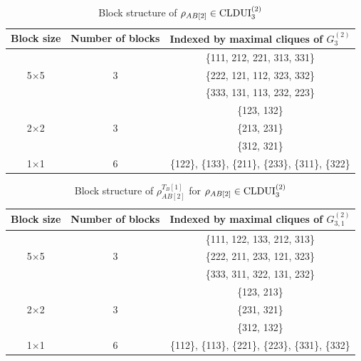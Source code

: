 \documentclass[11pt]{article}
\newcommand{\CLDUI}{\text{\rm CLDUI}}
\theoremstyle{plain}
\begin{document}

\bigskip
\begin{table}[h]
    \centering
    \begin{tabular}{c|c|c}
         Block size & Number of blocks & Indexed by  maximal cliques of $G_3^{(2)}$\\\hline
          &  & \{111, 212, 221, 313, 331\}\\
         5$\times$5 & 3 &\{222, 121, 112, 323, 332\}\\
          & &\{333, 131, 113, 232, 223\}\\\hline
           &  & \{123, 132\}\\
          2$\times$2& 3 & \{213, 231\}\\
          & & \{312, 321\}\\\hline
          1$\times$1 & 6 & \{122\}, \{133\}, \{211\}, \{233\}, \{311\}, \{322\}
    \end{tabular}
     \caption{Block structure of $\rho_{AB[2]}\in\CLDUI^{(2)}_3$}\label{table0}
 \end{table}
 
 \bigskip  
\begin{table}[h]     \centering
    \begin{tabular}{c|c|c}
         Block size & Number of blocks & Indexed by maximal cliques of $G_{3,1}^{(2)}$ \\\hline
          &  & \{111, 122, 133, 212, 313\}\\
         5$\times$5 & 3 & \{222, 211, 233, 121, 323\}\\
          & &\{333, 311, 322, 131, 232\}\\\hline
           &  & \{123, 213\}\\
          2$\times$2& 3 & \{231, 321\}\\
          & & \{312, 132\}\\\hline
          1$\times$1 & 6 & \{112\}, \{113\}, \{221\}, \{223\}, \{331\}, \{332\}
    \end{tabular}
  \caption{Block structure of $\rho_{AB[2]}^{T_B[1]}$ for $\rho_{AB[2]}\in\CLDUI^{(2)}_3$}\label{table1}
  \end{table}
  
\end{document}
